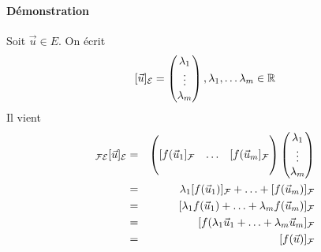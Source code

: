\paragraph{Démonstration} Soit $\vec{u} \in E$. On écrit
$$[\vec{u}]_{\mathcal{E}} = \begin{pmatrix} \lambda_1 \\ \vdots \\ \lambda_m \end{pmatrix}, \lambda_1, \ldots \lambda_m \in \mathbb{R}$$
Il vient
\begin{eqnarray*}
  [f]_{\cF \cE}[\vec{u}]_{\cE}
  &=& 
  \begin{pmatrix} \\ [f(\vec{u}_1]_\cF & \ldots & [f(\vec{u}_m]_\cF \\ \\ \end{pmatrix}
  \begin{pmatrix} \lambda_1 \\ \vdots \\ \lambda_m \end{pmatrix} \\
  &=& \lambda_1 [f(\vec{u}_1)]_\cF + \ldots + [f(\vec{u}_m)]_\cF \\
  &=& [\lambda_1 f(\vec{u}_1) + \ldots + \lambda_m f(\vec{u}_m)]_\cF \\
  &=& [ f( \lambda_1 \vec{u}_1 + \ldots + \lambda_m \vec{u}_m]_\cF \\
  &=& [f(\vec{u})]_\cF
\end{eqnarray*}

